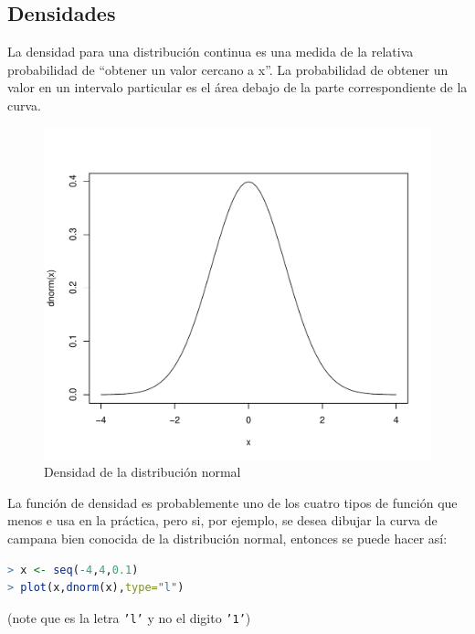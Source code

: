 \subsection{Densidades}

La densidad para una distribución continua es una medida de la relativa
probabilidad de ``obtener un valor cercano a x''. La probabilidad de obtener un
valor en un intervalo particular es el área debajo de la parte correspondiente
de la curva.

\newpage

\begin{figure}[H]
    \includegraphics[width=\linewidth]{fig-7.pdf}
    \caption{Densidad de la distribución normal}
    \label{fig:fig-7}
\end{figure}


La función de densidad es probablemente uno de los cuatro tipos de función que
menos e usa en la práctica, pero si, por ejemplo, se desea dibujar la curva de
campana bien conocida de la distribución normal, entonces se puede hacer así:

\begin{lstlisting}[language=R]
> x <- seq(-4,4,0.1)
> plot(x,dnorm(x),type="l")
\end{lstlisting}

(note que es la letra \texttt{'l'} y no el digito \texttt{'1'})

